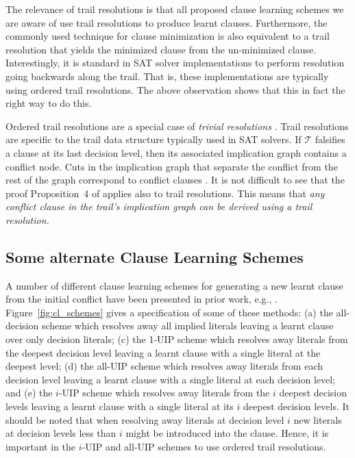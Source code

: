 \documentclass[runningheads]{llncs}
\newcommand{\sat}{SAT\xspace}
\newcommand{\trail}{\ensuremath{\mathcal{T}}}
\newcommand{\nf}[1]{{\color{red}{#1}}}
\begin{document}
The relevance of trail resolutions is that all proposed clause
learning schemes we are aware of use trail resolutions to produce
learnt clauses. Furthermore, the commonly used technique for clause
minimization \cite{DBLP:conf/sat/SorenssonB09} is also equivalent to a
trail resolution that yields the minimized clause from the
un-minimized clause. Interestingly, it is standard in \sat solver
implementations to perform resolution going backwards along the
trail. That is, these implementations are typically using ordered
trail resolutions. The above observation shows that this in fact the
right way to do this.

Ordered trail resolutions are a special case of \textit{trivial
  resolutions} \cite{DBLP:journals/jair/BeameKS04}. Trail resolutions
are specific to the trail data structure typically used in \sat
solvers. If $\trail$ falsifies a clause at its last decision level,
then its associated implication graph
\cite{DBLP:journals/tc/Marques-SilvaS99} contains a conflict
node. Cuts in the implication graph that separate the conflict from
the rest of the graph correspond to conflict clauses
\cite{DBLP:journals/jair/BeameKS04}. It is not difficult to see that
the proof Proposition~4 of \cite{DBLP:journals/jair/BeameKS04} applies
also to trail resolutions. This means that \textit{any conflict clause
  in the trail's implication graph can be derived using a trail
  resolution.}

\subsection{Some alternate Clause Learning Schemes}
A number of different clause learning schemes for generating a new
learnt clause from the initial conflict have been presented in prior
work, e.g.,
\cite{DBLP:conf/iccad/ZhangMMM01,DBLP:conf/iccad/SilvaS96,DBLP:journals/tc/Marques-SilvaS99,DBLP:conf/aaai/BayardoS97}.
Figure~\ref{fig:cl_schemes} gives a specification of some of these
methods: (a) the all-decision scheme which resolves away all implied
literals leaving a learnt clause over only decision literals; (c) the
1-UIP scheme which resolves away literals from the deepest decision
level leaving a learnt clause with a single literal at the deepest
level; (d) the all-UIP scheme which resolves away literals from each
decision level leaving a learnt clause with a single literal at each
decision level; and (e) the $i$-UIP scheme which resolves away
literals from the $i$ deepest decision levels leaving a learnt clause
with a single literal at its $i$ deepest decision levels. It should be
noted that when resolving away literals at decision level $i$\nf{,} new
literals at decision levels less than $i$ might be introduced into the
clause. Hence, it is important in the $i$-UIP and all-UIP schemes to
use ordered trail resolutions.
\end{document}
